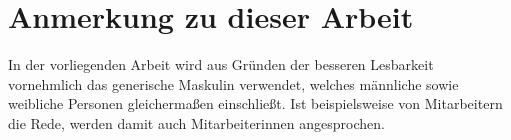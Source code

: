 \documentclass[
    ngerman          %
,a4paper          %
,12pt
,pdftex
]{report}
\begin{document}



    \onehalfspacing

    
    
    

    \newpage
    \tableofcontents           %

    

    \bigskip

    \section*{Anmerkung zu dieser Arbeit}
    In der vorliegenden Arbeit wird aus Gründen der besseren Lesbarkeit vornehmlich das generische Maskulin verwendet, welches männliche sowie weibliche Personen gleichermaßen einschließt. Ist beispielsweise von Mitarbeitern die Rede, werden damit auch Mitarbeiterinnen angesprochen.\\
    

    






% 
% 

    \def\refname{Literaturverzeichnis}
%
    \printbibliography

%

\end{document}
